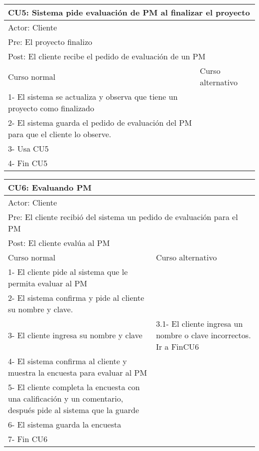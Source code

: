 \begin{table}[H]
  \begin{adjustbox}{max width = \textwidth}
  \begin{tabular}{|l|l|}
    \hline
    \multicolumn{2}{|l|}{CU5: Sistema pide evaluación de PM al finalizar el proyecto} \\\hline
    \multicolumn{2}{|l|}{Actor: Cliente} \\\hline
    \multicolumn{2}{|l|}{Pre: El proyecto finalizo} \\\hline
    \multicolumn{2}{|l|}{Post: El cliente recibe el pedido de evaluación de un PM} \\\hline
     Curso normal & Curso alternativo\\ \hline
     1- El sistema se actualiza y observa que tiene un proyecto como finalizado & \\ \hline
     2- El sistema guarda el pedido de evaluación del PM para que el cliente lo observe. &\\ \hline
     3- Usa CU5 &\\ \hline
     4- Fin CU5 & \\ \hline
  \end{tabular}
  \end{adjustbox}
\end{table}

\begin{table}[H]
  \begin{adjustbox}{max width = \textwidth}
  \begin{tabular}{|l|l|}
    \hline
    \multicolumn{2}{|l|}{CU6: Evaluando PM} \\\hline
    \multicolumn{2}{|l|}{Actor: Cliente} \\\hline
    \multicolumn{2}{|l|}{Pre: El cliente recibió del sistema un pedido de evaluación para el PM} \\\hline
    \multicolumn{2}{|l|}{Post: El cliente evalúa al PM} \\\hline
     Curso normal & Curso alternativo\\ \hline
     1- El cliente pide al sistema que le permita evaluar al PM & \\ \hline
     2- El sistema confirma y pide al cliente su nombre y clave. & \\ \hline
     3- El cliente ingresa su nombre y clave & 3.1- El cliente ingresa un nombre o clave incorrectos. Ir a FinCU6\\ \hline
     4- El sistema confirma al cliente y muestra la encuesta para evaluar al PM & \\ \hline
     5- El cliente completa la encuesta con una calificación y un comentario, después pide al sistema que la guarde & \\ \hline
     6- El sistema guarda la encuesta & \\ \hline
     7- Fin CU6 & \\ \hline
  \end{tabular}
  \end{adjustbox}
\end{table}


